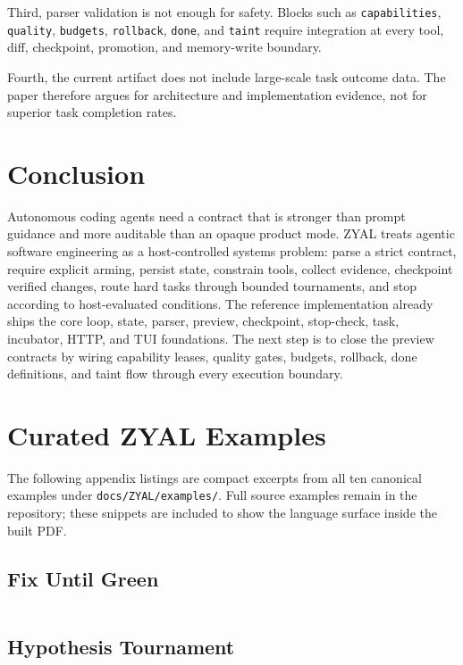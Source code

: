 \documentclass[conference]{IEEEtran}
\newcommand{\ZYAL}{ZYAL}
\begin{document}
Third, parser validation is not enough for safety. Blocks such as \texttt{capabilities}, \texttt{quality}, \texttt{budgets}, \texttt{rollback}, \texttt{done}, and \texttt{taint} require integration at every tool, diff, checkpoint, promotion, and memory-write boundary.

Fourth, the current artifact does not include large-scale task outcome data. The paper therefore argues for architecture and implementation evidence, not for superior task completion rates.

\section{Conclusion}

Autonomous coding agents need a contract that is stronger than prompt guidance and more auditable than an opaque product mode. \ZYAL{} treats agentic software engineering as a host-controlled systems problem: parse a strict contract, require explicit arming, persist state, constrain tools, collect evidence, checkpoint verified changes, route hard tasks through bounded tournaments, and stop according to host-evaluated conditions. The reference implementation already ships the core loop, state, parser, preview, checkpoint, stop-check, task, incubator, HTTP, and TUI foundations. The next step is to close the preview contracts by wiring capability leases, quality gates, budgets, rollback, done definitions, and taint flow through every execution boundary.

\onecolumn
\appendices
\section{Curated \ZYAL{} Examples}

The following appendix listings are compact excerpts from all ten canonical examples under \texttt{docs/ZYAL/examples/}. Full source examples remain in the repository; these snippets are included to show the language surface inside the built PDF.

\subsection{Fix Until Green}
\inputminted{yaml}{listings/fix-until-green.zyal}

\subsection{Hypothesis Tournament}
\inputminted{yaml}{listings/hypothesis-tournament.zyal}
\end{document}
